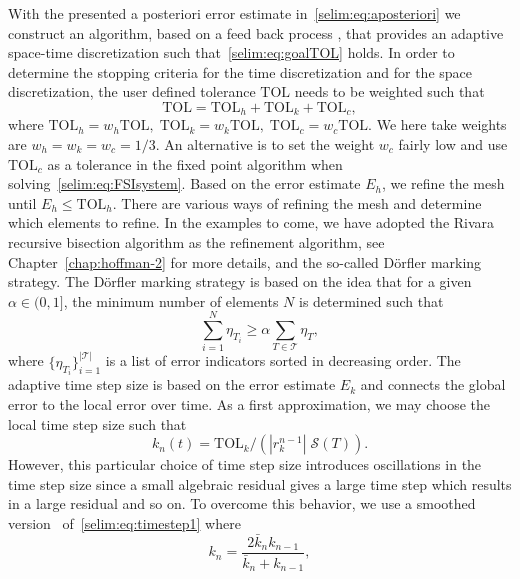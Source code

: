 With the presented a posteriori error estimate
in~\eqref{selim:eq:aposteriori} we construct an algorithm, based on a
feed back process , that provides an adaptive space-time
discretization such that~\eqref{selim:eq:goalTOL} holds. In order to
determine the stopping criteria for the time discretization and for
the space discretization, the user defined tolerance $\mathrm{TOL}$
needs to be weighted such that
\begin{equation}
\mathrm{TOL} = \mathrm{TOL}_h + \mathrm{TOL}_k + \mathrm{TOL}_c,
\end{equation}
where $\mathrm{TOL}_h = w_h \mathrm{TOL}, \;\mathrm{TOL}_k = w_k
\mathrm{TOL}, \;\mathrm{TOL}_c = w_c \mathrm{TOL}$.  We here take
weights are $w_h = w_k = w_c = 1/3$. An alternative is to set the
weight $w_c$ fairly low and use $\mathrm{TOL}_c$ as a tolerance in the
fixed point algorithm when solving~\eqref{selim:eq:FSIsystem}. Based
on the error estimate $E_h$, we refine the mesh until $E_h \leq
\mathrm{TOL}_h$.  There are various ways of refining the mesh and
determine which elements to refine. In the examples to come, we have
adopted the Rivara recursive bisection algorithm as the refinement
algorithm, see Chapter~\ref{chap:hoffman-2} for more details, and the
so-called D\"{o}rfler \cite{dorfler1996} marking strategy. The
D\"{o}rfler marking strategy is based on the idea that for a given
$\alpha\in(0,1]$, the minimum number of elements $N$ is determined 
such that
\begin{equation}
  \label{selim:eq:dorfler}
\sum_{i=1}^{N}\eta_{T_i} \geq  \alpha \sum_{T\in\mathcal{T}}\eta_T , 
\end{equation}
where $\{ \eta_{T_{i}}\}_{i = 1}^{|\mathcal{T}|}$ is a list of error
indicators sorted in decreasing order.  The adaptive time step size is
based on the error estimate $E_k$ and connects the global error to the
local error over time. As a first approximation, we may choose the
local time step size such that
\begin{equation}
\label{selim:eq:timestep1}
k_n(t) = \mathrm{TOL}_k /(| r_k^{n-1} |\; \mathcal{S}(T)).
\end{equation}
However, this particular choice of time step
size introduces oscillations in the time step size since a small
algebraic residual gives a large time step which results in a large
residual and so on. To overcome this behavior, we use a smoothed
version~\cite{Logg2003d} of~\eqref{selim:eq:timestep1} where
\begin{equation}
\label{selim:eq:timestep2}
k_n = \frac{2\bar{k}_n k_{n-1}}{\bar{k}_n + k_{n-1}},
\end{equation}
